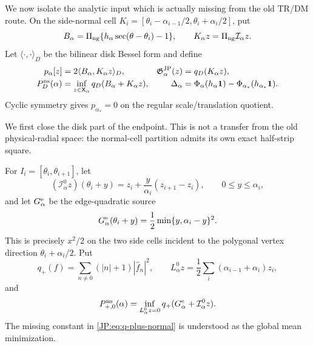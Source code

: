\documentclass[11pt]{amsart}
\numberwithin{equation}{section}
\theoremstyle{definition}
\theoremstyle{remark}
\newcommand{\Gjp}{\mathfrak G^{\rm JP}}
\begin{document}
We now isolate the analytic input which is actually missing from the old
TR/DM route.  On the side-normal cell
$K_i=[\theta_i-\alpha_{i-1}/2,\theta_i+\alpha_i/2]$, put
\begin{equation}\label{JP:eq:disk-source-B}
 B_\alpha=\Pi_{\rm ng}\{h_\alpha\sec(\theta-\theta_i)-1\},
 \qquad K_\alpha z=\Pi_{\rm ng}\mathcal I_\alpha z.
\end{equation}
Let $\langle\cdot,\cdot\rangle_D$ be the bilinear disk Bessel form and
define
\begin{align}
 p_\alpha[z]&=2\langle B_\alpha,K_\alpha z\rangle_D,
 &\Gjp_\alpha(z)&=q_D(K_\alpha z),\label{JP:eq:JE-forms}\\
 P_D^{\rm ns}(\alpha)&=
 \inf_{z\in\mathsf X_\alpha}q_D(B_\alpha+K_\alpha z),
 &\Delta_\alpha&=
 \Phi_\alpha(h_\alpha\mathbf1)
 -\Phi_{\alpha_*}(h_{\alpha_*}\mathbf1).
 \label{JP:eq:D0ns-definition}
\end{align}
Cyclic symmetry gives $p_{\alpha_*}=0$ on the regular scale/translation
quotient.

We first close the disk part of the endpoint.  This is not a transfer from
the old physical-radial space: the normal-cell partition admits its own
exact half-strip square.

For $I_i=[\theta_i,\theta_{i+1}]$, let
\begin{equation}\label{JP:eq:normal-linear-spline}
 (\mathcal I_\alpha^0z)(\theta_i+y)
 =z_i+\frac{y}{\alpha_i}(z_{i+1}-z_i),
 \qquad 0\le y\le\alpha_i,
\end{equation}
and let $G_\alpha^{\rm e}$ be the edge-quadratic source
\begin{equation}\label{JP:eq:edge-source-on-normal-cell}
 G_\alpha^{\rm e}(\theta_i+y)
 =\frac12\min\{y,\alpha_i-y\}^2.
\end{equation}
This is precisely $x^2/2$ on the two side cells incident to the polygonal
vertex direction $\theta_i+\alpha_i/2$.  Put
\begin{equation}\label{JP:eq:q-plus-normal}
 q_+(f)=\sum_{n\ne0}(|n|+1)|\widehat f_n|^2,
 \qquad
 L_\alpha^0z=\frac12\sum_i(\alpha_{i-1}+\alpha_i)z_i,
\end{equation}
and
\begin{equation}\label{JP:eq:P-plus-normal-linear}
 P_{+,0}^{\rm ns}(\alpha)
 =\inf_{L_\alpha^0z=0}q_+(G_\alpha^{\rm e}+\mathcal I_\alpha^0z).
\end{equation}
The missing constant in \eqref{JP:eq:q-plus-normal} is understood as the
global mean minimization.
\end{document}
